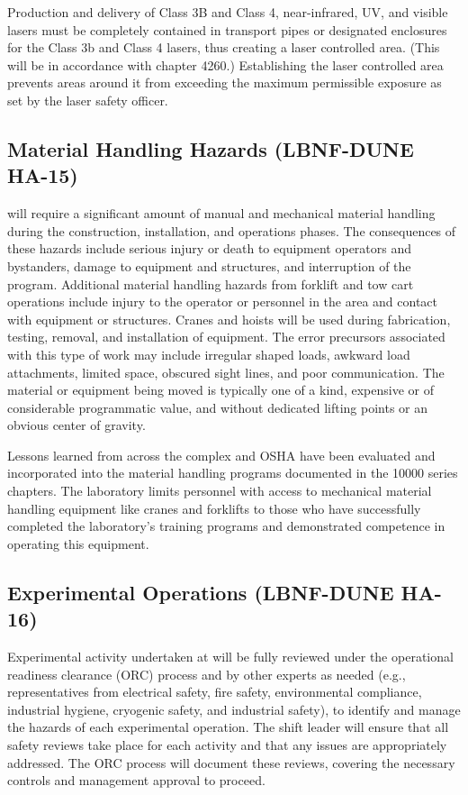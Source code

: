 Production and delivery of Class 3B and Class 4, near-infrared, UV,
and visible lasers must be completely contained in transport pipes or
designated enclosures for the Class 3b and Class 4 lasers, thus
creating a laser controlled area. (This will be in accordance with
\fnal {} chapter 4260.)  Establishing the laser controlled
area prevents areas around it from exceeding the maximum permissible
exposure as set by the \fnal laser safety officer.

\subsection{Material Handling Hazards (LBNF-DUNE HA-15)}

 will require a significant amount of manual and mechanical
material handling during the construction, installation, and operations
phases.  The consequences of these hazards include serious injury or
death to equipment operators and bystanders, damage to equipment and
structures, and interruption of the program.  Additional material
handling hazards from forklift and tow cart operations include injury
to the operator or personnel in the area and contact with equipment or
structures. Cranes and hoists will be used during fabrication,
testing, removal, and installation of equipment. The error precursors
associated with this type of work may include irregular shaped loads,
awkward load attachments, limited space, obscured sight lines, and
poor communication.  The material or equipment being moved is
typically one of a kind, expensive or of considerable programmatic
value, and without dedicated lifting points or an obvious center
of gravity.

Lessons learned from across the  complex and OSHA have been
evaluated and incorporated into the \fnal material handling programs
documented in the  10000 series chapters.  The laboratory
limits personnel with access to mechanical material handling equipment
like cranes and forklifts to those who have successfully completed the
laboratory's training programs and demonstrated competence in
operating this equipment.


\subsection{Experimental Operations (LBNF-DUNE HA-16)}

Experimental activity undertaken at  will be
fully reviewed under the operational readiness clearance (ORC) process
and by other experts as needed (e.g., representatives from electrical
safety, fire safety, environmental compliance, industrial hygiene,
cryogenic safety, and industrial safety), to identify and manage the
hazards of each experimental operation. The shift leader will ensure
that all safety reviews take place for each activity and that any
issues are appropriately addressed. The ORC process will document
these reviews, covering the necessary controls and management approval
to proceed.

